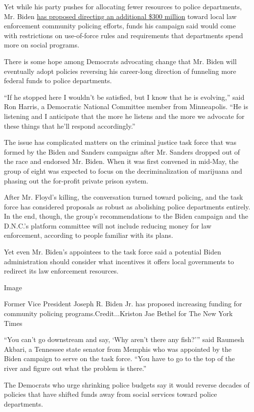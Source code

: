 Yet while his party pushes for allocating fewer resources to police
departments, Mr. Biden \href{https://joebiden.com/justice/}{has proposed
directing an additional \$300 million} toward local law enforcement
community policing efforts, funds his campaign said would come with
restrictions on use-of-force rules and requirements that departments
spend more on social programs.

There is some hope among Democrats advocating change that Mr. Biden will
eventually adopt policies reversing his career-long direction of
funneling more federal funds to police departments.

``If he stopped here I wouldn't be satisfied, but I know that he is
evolving,'' said Ron Harris, a Democratic National Committee member from
Minneapolis. ``He is listening and I anticipate that the more he listens
and the more we advocate for these things that he'll respond
accordingly.''

The issue has complicated matters on the criminal justice task force
that was formed by the Biden and Sanders campaigns after Mr. Sanders
dropped out of the race and endorsed Mr. Biden. When it was first
convened in mid-May, the group of eight was expected to focus on the
decriminalization of marijuana and phasing out the for-profit private
prison system.

After Mr. Floyd's killing, the conversation turned toward policing, and
the task force has considered proposals as robust as abolishing police
departments entirely. In the end, though, the group's recommendations to
the Biden campaign and the D.N.C.'s platform committee will not include
reducing money for law enforcement, according to people familiar with
its plans.

Yet even Mr. Biden's appointees to the task force said a potential Biden
administration should consider what incentives it offers local
governments to redirect its law enforcement resources.

Image

Former Vice President Joseph R. Biden Jr. has proposed increasing
funding for community policing programs.Credit...Kriston Jae Bethel for
The New York Times

``You can't go downstream and say, `Why aren't there any fish?''' said
Raumesh Akbari, a Tennessee state senator from Memphis who was appointed
by the Biden campaign to serve on the task force. ``You have to go to
the top of the river and figure out what the problem is there.''

The Democrats who urge shrinking police budgets say it would reverse
decades of policies that have shifted funds away from social services
toward police departments.

